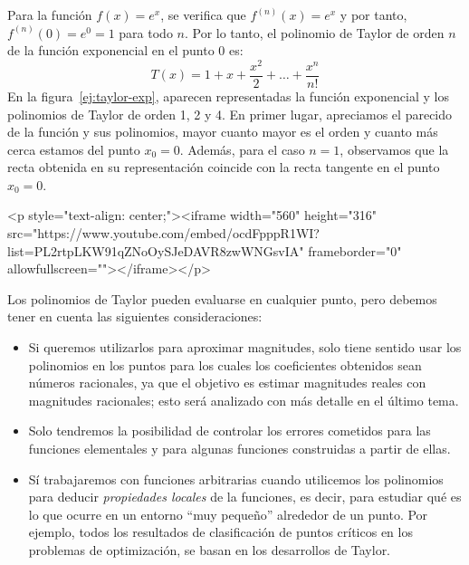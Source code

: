 \begin{ejemplo}\label{ej:exp}
Para la función $f(x)=e^x$, se verifica que $f^{(n)}(x)=e^x$ y por tanto, $f^{(n)}(0)=e^0=1$ para todo $n$. Por lo tanto, el polinomio de Taylor de orden $n$ de la función exponencial en el punto 0 es:
\[
T(x)=1+x+\frac{x^2}{2}+\dots+\frac{x^n}{n!}
\]
En la figura~\ref{ej:taylor-exp}, aparecen representadas la función exponencial y los polinomios de Taylor de orden 1, 2 y 4. En primer lugar, apreciamos el parecido de la función y sus polinomios, mayor cuanto mayor es el orden y cuanto más cerca estamos del punto $x_0=0$. Además, para el caso $n=1$, observamos que la recta obtenida en su representación coincide con la recta tangente en el punto $x_0=0$.\fej 
%
\end{ejemplo}

\begin{rawhtml}
<p style="text-align: center;"><iframe width="560" height="316" src="https://www.youtube.com/embed/ocdFpppR1WI?list=PL2rtpLKW91qZNoOySJeDAVR8zwWNGsvIA" frameborder="0" allowfullscreen=""></iframe></p>
\end{rawhtml}

Los polinomios de Taylor pueden evaluarse en cualquier punto, pero debemos tener en cuenta las siguientes consideraciones:
\begin{itemize}
\item
Si queremos utilizarlos para aproximar magnitudes, solo tiene sentido usar los polinomios en los puntos para los cuales los coeficientes obtenidos sean números racionales, ya que el objetivo es estimar magnitudes reales con magnitudes racionales; esto será analizado con más detalle en el último tema.
\item
Solo tendremos la posibilidad de controlar los errores cometidos para las funciones elementales y para algunas funciones construidas a partir de ellas.
\item
Sí trabajaremos con funciones arbitrarias cuando utilicemos los polinomios para deducir \emph{propiedades locales} de la funciones, es decir, para estudiar qué es lo que ocurre en un entorno ``muy pequeño'' alrededor de un punto.
Por ejemplo, todos los resultados de clasificación de puntos críticos en los problemas de optimización, se basan en los desarrollos de Taylor.
\end{itemize}

